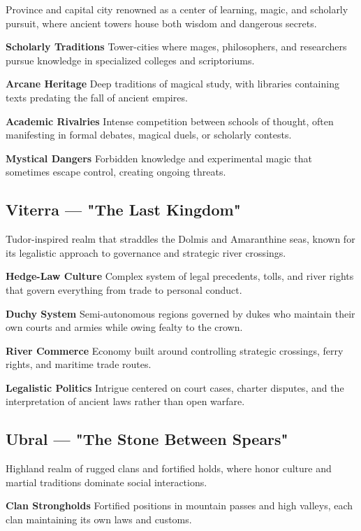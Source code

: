 \documentclass[11pt,twoside,openany]{book}
\begin{document}
Province and capital city renowned as a center of learning, magic, and scholarly pursuit, where ancient towers house both wisdom and dangerous secrets.

\textbf{Scholarly Traditions} Tower-cities where mages, philosophers, and researchers pursue knowledge in specialized colleges and scriptoriums.

\textbf{Arcane Heritage} Deep traditions of magical study, with libraries containing texts predating the fall of ancient empires.

\textbf{Academic Rivalries} Intense competition between schools of thought, often manifesting in formal debates, magical duels, or scholarly contests.

\textbf{Mystical Dangers} Forbidden knowledge and experimental magic that sometimes escape control, creating ongoing threats.

\subsection*{Viterra — "The Last Kingdom"}

Tudor-inspired realm that straddles the Dolmis and Amaranthine seas, known for its legalistic approach to governance and strategic river crossings.

\textbf{Hedge-Law Culture} Complex system of legal precedents, tolls, and river rights that govern everything from trade to personal conduct.

\textbf{Duchy System} Semi-autonomous regions governed by dukes who maintain their own courts and armies while owing fealty to the crown.

\textbf{River Commerce} Economy built around controlling strategic crossings, ferry rights, and maritime trade routes.

\textbf{Legalistic Politics} Intrigue centered on court cases, charter disputes, and the interpretation of ancient laws rather than open warfare.

\subsection*{Ubral — "The Stone Between Spears"}

Highland realm of rugged clans and fortified holds, where honor culture and martial traditions dominate social interactions.

\textbf{Clan Strongholds} Fortified positions in mountain passes and high valleys, each clan maintaining its own laws and customs.
\end{document}

